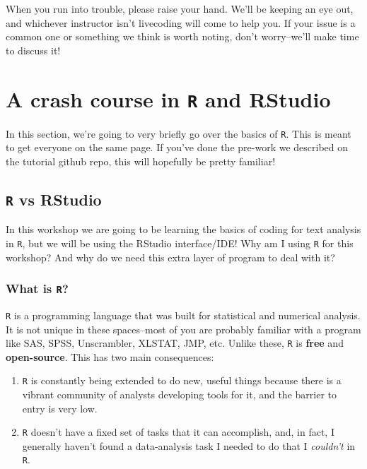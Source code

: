 \documentclass[
]{book}
\providecommand{\tightlist}{%
  \setlength{\itemsep}{0pt}\setlength{\parskip}{0pt}}
\begin{document}
When you run into trouble, please raise your hand. We'll be keeping an eye out, and whichever instructor isn't livecoding will come to help you. If your issue is a common one or something we think is worth noting, don't worry--we'll make time to discuss it!

\hypertarget{a-crash-course-in-r-and-rstudio}{%
\chapter{\texorpdfstring{A crash course in \texttt{R} and RStudio}{A crash course in R and RStudio}}\label{a-crash-course-in-r-and-rstudio}}

In this section, we're going to very briefly go over the basics of \texttt{R}. This is meant to get everyone on the same page. If you've done the pre-work we described on the tutorial github repo, this will hopefully be pretty familiar!

\hypertarget{r-vs-rstudio}{%
\section{\texorpdfstring{\texttt{R} vs RStudio}{R vs RStudio}}\label{r-vs-rstudio}}

In this workshop we are going to be learning the basics of coding for text analysis in \texttt{R}, but we will be using the RStudio interface/IDE! Why am I using \texttt{R} for this workshop? And why do we need this extra layer of program to deal with it?

\hypertarget{what-is-r}{%
\subsection{\texorpdfstring{What is \texttt{R}?}{What is R?}}\label{what-is-r}}

\texttt{R} is a programming language that was built for statistical and numerical analysis. It is not unique in these spaces--most of you are probably familiar with a program like SAS, SPSS, Unscrambler, XLSTAT, JMP, etc. Unlike these, \texttt{R} is \textbf{free} and \textbf{open-source}. This has two main consequences:

\begin{enumerate}
\def\labelenumi{\arabic{enumi}.}
\tightlist
\item
  \texttt{R} is constantly being extended to do new, useful things because there is a vibrant community of analysts developing tools for it, and the barrier to entry is very low.\\
\item
  \texttt{R} doesn't have a fixed set of tasks that it can accomplish, and, in fact, I generally haven't found a data-analysis task I needed to do that I \emph{couldn't} in \texttt{R}.
\end{enumerate}
\end{document}
